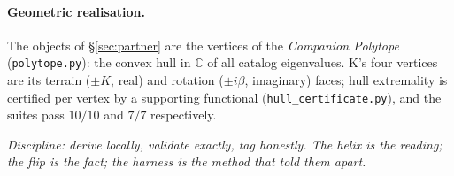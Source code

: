 \documentclass[11pt]{article}
\theoremstyle{plain}
\theoremstyle{definition}
\theoremstyle{remark}
\newcommand{\Cx}{\mathbb{C}}
\newcommand{\Kf}{\mathrm{K}}
\begin{document}
\paragraph{Geometric realisation.} The objects of \S\ref{sec:partner} are the vertices of the
\emph{Companion Polytope} (\texttt{polytope.py}): the convex hull in $\Cx$ of all catalog eigenvalues.
$\Kf$'s four vertices are its terrain ($\pm K$, real) and rotation ($\pm i\beta$, imaginary) faces;
hull extremality is certified per vertex by a supporting functional (\texttt{hull\_certificate.py}), and the
suites pass $10/10$ and $7/7$ respectively.

\vspace{0.6em}
\noindent\emph{Discipline: derive locally, validate exactly, tag honestly. The helix is the reading; the flip
is the fact; the harness is the method that told them apart.}
\end{document}
